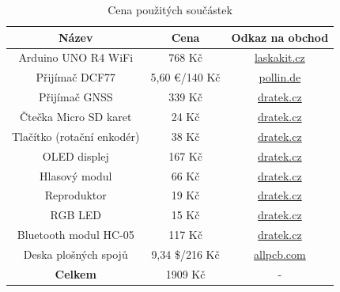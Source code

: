 \begin{table}[H]
    \centering
    \caption{Cena použitých součástek}
    \begin{tabular}{|c|c|c|}
    \hline
    \textbf{Název} & \textbf{Cena} & \textbf{Odkaz na obchod}\\
    \hline\hline
    Arduino UNO R4 WiFi         & 768 Kč            & \href{https://www.laskakit.cz/arduino-uno-r4-wifi--original/}{laskakit.cz}  \\ \hline
    Přijímač DCF77              & 5,60 \euro/140 Kč  & \href{https://www.pollin.de/p/dcf-empfangsmodul-dcf1-810054}{pollin.de} \\ \hline
    Přijímač GNSS               & 339 Kč            & \href{https://dratek.cz/arduino/1733-gps-satelitni-urceni-polohy-neo-7m-modul.html?}{dratek.cz} \\ \hline
    Čtečka Micro SD karet       & 24 Kč             & \href{https://dratek.cz/arduino/993-ctecka-microsd-karet.html?}{dratek.cz} \\ \hline
    Tlačítko (rotační enkodér)   & 38 Kč             & \href{https://dratek.cz/arduino/837-rotacni-enkoder.html?}{dratek.cz} \\ \hline
    OLED displej                & 167 Kč            & \href{https://dratek.cz/arduino/3181-iic-i2c-oled-1-3-displej-128x64-bily.html?}{dratek.cz} \\ \hline
    Hlasový modul               & 66 Kč             & \href{https://dratek.cz/arduino/4857-hlasovy-modul-s-integrovanym-mp3-prehravacem-dfplayer.html?}{dratek.cz} \\ \hline
    Reproduktor                 & 19 Kč             & \href{https://dratek.cz/arduino/1175-reproduktor-1w-8ohm.html?}{dratek.cz} \\ \hline
    RGB LED                     & 15 Kč             & \href{https://dratek.cz/arduino/837-rotacni-enkoder.html}{dratek.cz} \\ \hline
    Bluetooth modul HC-05       & 117 Kč            & \href{https://dratek.cz/arduino/1005-bluetooth-modul-hc-05.html?}{dratek.cz} \\ \hline
    Deska plošných spojů        & 9,34 \$/216 Kč    & \href{https://www.allpcb.com/}{allpcb.com} \\ \hline
     \textbf{Celkem}            & 1909 Kč           & - \\ \hline
    \end{tabular}\\
\end{table}


